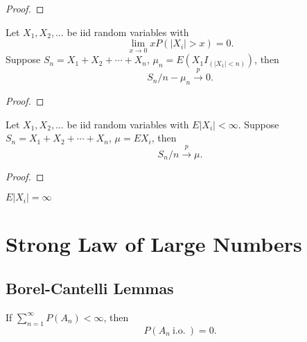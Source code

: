 \begin{proof}

\end{proof}

\begin{theorem}
	Let $X_1,X_2,\ldots$ be iid random variables with
	\begin{equation}
		\lim_{x\rightarrow 0}xP(|X_i|>x)=0.
	\end{equation}
	Suppose $S_n=X_1+X_2+\cdots+X_n$, $\mu_n=E\left(X_1I_{(|X_1|<n)}\right)$, then
	\begin{equation}
		S_n/n-\mu_n\stackrel{p}{\rightarrow}0.
	\end{equation}
\end{theorem}

\begin{proof}

\end{proof}

\begin{theorem} \label{thm:WLLN}
	Let $X_1,X_2,\ldots$ be iid random variables with $E|X_i|<\infty$. Suppose $S_n=X_1+X_2+\cdots+X_n$, $\mu=EX_i$, then
	\begin{equation}
		S_n/n\stackrel{p}{\rightarrow}\mu.
	\end{equation}
\end{theorem}

\begin{proof}

\end{proof}

\begin{remark}
	$E|X_i|=\infty$
\end{remark}

\section{Strong Law of Large Numbers}

\subsection{Borel-Cantelli Lemmas}

\begin{lemma} \label{lem:borel-cantelli-lemma}
	If $\sum_{n=1}^{\infty}P\left(A_{n}\right)<\infty$, then
	\begin{equation}
		P\left(A_{n}\ \text{i.o.}\ \right)=0.
	\end{equation}
\end{lemma}

